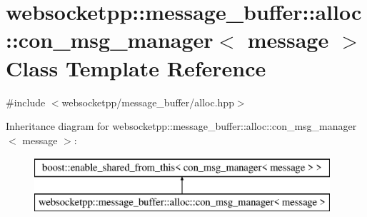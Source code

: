 \hypertarget{classwebsocketpp_1_1message__buffer_1_1alloc_1_1con__msg__manager}{}\section{websocketpp\+:\+:message\+\_\+buffer\+:\+:alloc\+:\+:con\+\_\+msg\+\_\+manager$<$ message $>$ Class Template Reference}
\label{classwebsocketpp_1_1message__buffer_1_1alloc_1_1con__msg__manager}


{\ttfamily \#include $<$websocketpp/message\+\_\+buffer/alloc.\+hpp$>$}

Inheritance diagram for websocketpp\+:\+:message\+\_\+buffer\+:\+:alloc\+:\+:con\+\_\+msg\+\_\+manager$<$ message $>$\+:\begin{figure}[H]
\begin{center}
\leavevmode
\includegraphics[height=2.000000cm]{classwebsocketpp_1_1message__buffer_1_1alloc_1_1con__msg__manager}
\end{center}
\end{figure}
